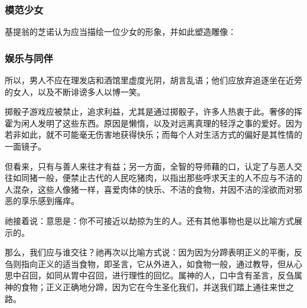 
\subsubsection{模范少女}

基提翁的芝诺认为应当描绘一位少女的形象，并如此塑造雕像：\par


\subsubsection{娱乐与同伴}

所以，男人不应在理发店和酒馆里虚度光阴，胡言乱语；他们应放弃追逐坐在近旁的女人，以及不断诽谤多人以博一笑。\par

掷骰子游戏应被禁止，追求利益，尤其是通过掷骰子，许多人热衷于此。奢侈的挥霍为闲人发明了这些东西。原因是懒惰，以及对远离真理的轻浮之事的爱好。因为若非如此，就不可能毫无伤害地获得快乐；而每个人对生活方式的偏好是其性情的一面镜子。\par

但看来，只有与善人来往才有益；另一方面，全智的导师藉的口，认定了与恶人交往如同猪一般，便禁止古代的人民吃猪肉，以指出那些呼求天主的人不应与不洁的人混杂，这些人像猪一样，喜爱肉体的快乐、不洁的食物，并因不洁的淫欲而对邪恶的享乐感到瘙痒。\par

祂接着说：意思是：你不可接近以劫掠为生的人。还有其他事物也是以比喻方式展示的。\par

那么，我们应与谁交往？祂再次以比喻方式说：因为因为分蹄表明正义的平衡，反刍则指向正义的适当食物，即圣言，它从外进入，如食物一般，通过教导，但从心思中召回，如同从胃中召回，进行理性的回忆。属神的人，口中含有圣言，反刍属神的食物；正义正确地分蹄，因为它在今生圣化我们，并送我们踏上通往来世之路。\par

